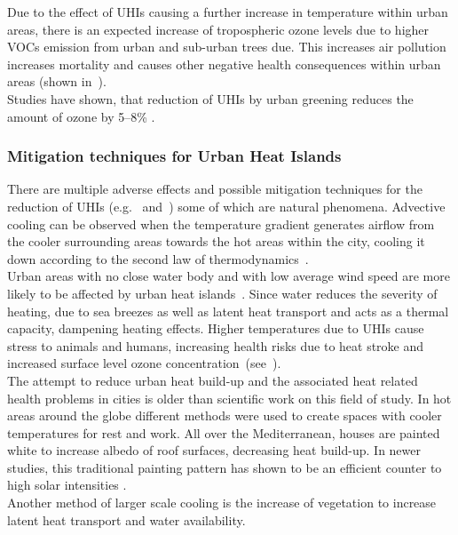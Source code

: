 \documentclass[12pt,a4paper, english,twoside]{scrartcl}
\begin{document}
      Due to the effect of \glspl{UHI} causing a further increase in temperature within urban areas, there is an expected increase of tropospheric ozone levels due to higher \glspl{VOC} emission from urban and sub-urban trees due. 
      This increases air pollution increases mortality and causes other negative health consequences within urban areas (shown in~\cite{Ebi2008}).\\ 
      Studies have shown, that reduction of \glspl{UHI} by urban greening reduces the amount of ozone by 5--8\% \autocite[p.209]{Fallmann2016}. 
    \subsubsection{Mitigation techniques for Urban Heat Islands}\label{ssec:mitigation}
      There are multiple adverse effects and possible mitigation techniques for the reduction of \glspl{UHI} (e.g.~\cite{Nichol1994} and~\cite{Stewart2011}) some of which are natural phenomena. %
      Advective cooling can be observed when the temperature gradient generates airflow from the cooler surrounding areas towards the hot areas within the city, cooling it down according to the second law of thermodynamics~\autocite{HaegerEugensson1999}. \\
      Urban areas with no close water body  and with low average wind speed are more likely to be affected by urban heat islands~\autocite{Ramamurthy2017}. 
      Since water reduces the severity of heating, due to sea breezes as well as latent heat transport and acts as a thermal capacity, dampening heating effects. 
      Higher temperatures due to \glspl{UHI} cause stress to animals and humans, increasing health risks due to heat stroke and increased surface level ozone concentration~(see~\cite{Santamouris2020}).\\
      The attempt to reduce urban heat build-up and the associated heat related health problems in cities is older than scientific work on this field of study. 
      In hot areas around the globe different methods were used to create spaces with cooler temperatures for rest and work. 
      All over the Mediterranean, houses are painted white to increase albedo of roof surfaces, decreasing heat build-up. 
      In newer studies, this traditional painting pattern has shown to be an efficient counter to high solar intensities \autocite{Fayad2021}.\\ 
      Another method of larger scale cooling is the increase of vegetation to increase latent heat transport and water availability.
\end{document}

